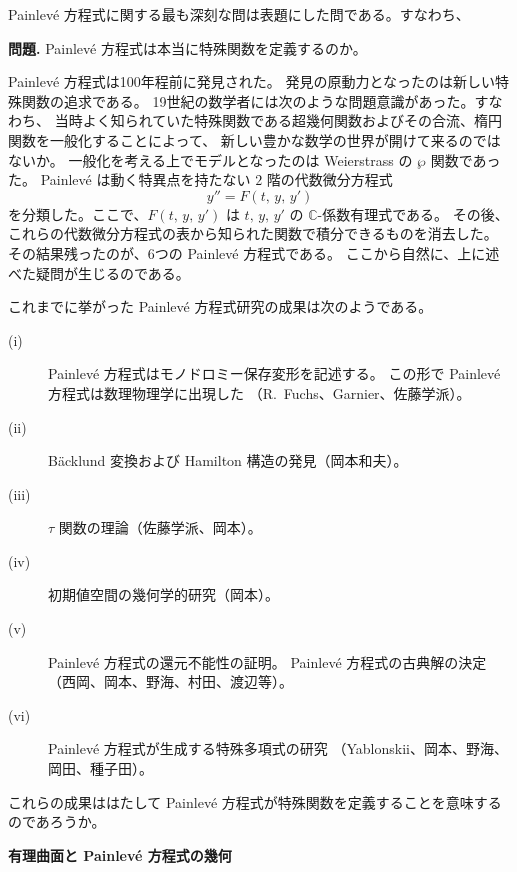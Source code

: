 \documentclass[uplatex,dvipdfmx]{jlreq}
\begin{document}
\bigskip

Painlevé 方程式に関する最も深刻な問は表題にした問である。すなわち、

\vspace{1pc}
\noindent\textbf{問題.}\quad
Painlevé 方程式は本当に特殊関数を定義するのか。
\vspace{1pc}

Painlevé 方程式は100年程前に発見された。
発見の原動力となったのは新しい特殊関数の追求である。
19世紀の数学者には次のような問題意識があった。すなわち、
当時よく知られていた特殊関数である超幾何関数およびその合流、楕円関数を一般化することによって、
新しい豊かな数学の世界が開けて来るのではないか。
一般化を考える上でモデルとなったのは Weierstrass の $\wp$ 関数であった。
Painlevé は動く特異点を持たない $2$ 階の代数微分方程式
\[
  y'' = F(t,\, y,\, y') \tag{2}
\]
を分類した。ここで、$F(t,\, y,\, y')$ は $t,\, y,\, y'$ の $\mathbb{C}$-係数有理式である。
その後、これらの代数微分方程式の表から知られた関数で積分できるものを消去した。
その結果残ったのが、6つの Painlevé 方程式である。
ここから自然に、上に述べた疑問が生じるのである。

これまでに挙がった Painlevé 方程式研究の成果は次のようである。
\begin{description}
  \item[(i)] Painlevé 方程式はモノドロミー保存変形を記述する。
             この形で Painlevé 方程式は数理物理学に出現した
             （R.~Fuchs、Garnier、佐藤学派）。
  \item[(ii)] Bäcklund 変換および Hamilton 構造の発見（岡本和夫）。
  \item[(iii)] $\tau$ 関数の理論（佐藤学派、岡本）。
  \item[(iv)] 初期値空間の幾何学的研究（岡本）。
  \item[(v)] Painlevé 方程式の還元不能性の証明。
             Painlevé 方程式の古典解の決定（西岡、岡本、野海、村田、渡辺等）。
  \item[(vi)] Painlevé 方程式が生成する特殊多項式の研究
             （Yablonskii、岡本、野海、岡田、種子田）。
\end{description}
これらの成果ははたして Painlevé 方程式が特殊関数を定義することを意味するのであろうか。

\newpage

\begin{center}
  {\large\bfseries 有理曲面と Painlevé 方程式の幾何}
\end{center}
\end{document}
